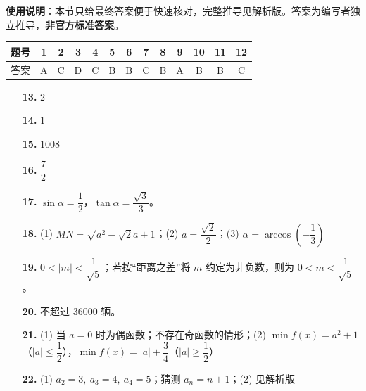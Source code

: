 
\begin{gknotice}
\textbf{使用说明}：本节只给最终答案便于快速核对，完整推导见解析版。答案为编写者独立推导，\textbf{非官方标准答案}。
\end{gknotice}

\begin{center}\begin{tabular}{ccccccccccccc}
\toprule
题号 & 1 & 2 & 3 & 4 & 5 & 6 & 7 & 8 & 9 & 10 & 11 & 12 \\
\midrule
答案 & A & C & D & C & B & B & C & B & A & B & B & C \\
\bottomrule
\end{tabular}\end{center}

\begin{itemize}[leftmargin=2.6em]
  \item[\textbf{13.}] $2$
  \item[\textbf{14.}] $1$
  \item[\textbf{15.}] $1008$
  \item[\textbf{16.}] $\dfrac72$
\end{itemize}

\begin{itemize}[leftmargin=2.6em]
  \item[\textbf{17.}] $\sin\alpha=\dfrac12$，$\tan\alpha=\dfrac{\sqrt3}{3}$。
  \item[\textbf{18.}] (1) $MN=\sqrt{a^2-\sqrt2a+1}$；(2) $a=\dfrac{\sqrt2}{2}$；(3) $\alpha=\arccos\left(-\dfrac13\right)$
  \item[\textbf{19.}] $0<|m|<\dfrac1{\sqrt5}$；若按“距离之差”将 $m$ 约定为非负数，则为 $0<m<\dfrac1{\sqrt5}$。
  \item[\textbf{20.}] 不超过 $36000$ 辆。
  \item[\textbf{21.}] (1) 当 $a=0$ 时为偶函数；不存在奇函数的情形；(2) $\min f(x)=a^2+1$（$|a|\leqslant\dfrac12$），$\min f(x)=|a|+\dfrac34$（$|a|\geqslant\dfrac12$）
  \item[\textbf{22.}] (1) $a_2=3,\ a_3=4,\ a_4=5$；猜测 $a_n=n+1$；(2) 见解析版
\end{itemize}
